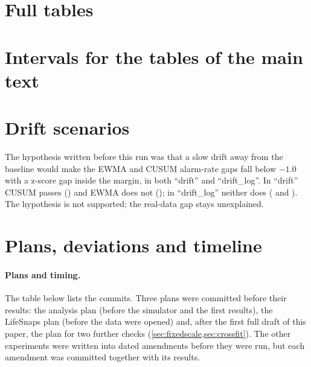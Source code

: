 \documentclass[11pt,a4paper]{article}
\begin{document}
\section{Full tables}




\section{Intervals for the tables of the main text}\label{app:intervals}




\section{Drift scenarios}\label{app:drift}

The hypothesis written before this run was that a slow drift away from the baseline would make the EWMA and CUSUM alarm-rate gaps fall below $-1.0$ with a z-score gap inside the margin, in both ``drift'' and ``drift\_log''. In ``drift'' CUSUM passes (\DriftCusum) and EWMA does not (\DriftEwma); in ``drift\_log'' neither does (\DriftLogCusum{} and \DriftLogEwma). The hypothesis is not supported; the real-data gap stays unexplained.

\section{Plans, deviations and timeline}\label{app:timeline}
\paragraph{Plans and timing.}
The table below lists the commits. Three plans were committed before their results: the analysis plan (before the simulator and the first results), the LifeSnaps plan (before the data were opened) and, after the first full draft of this paper, the plan for two further checks (\cref{sec:fixedscale,sec:crossfit}). The other experiments were written into dated amendments before they were run, but each amendment was committed together with its results.
\end{document}

